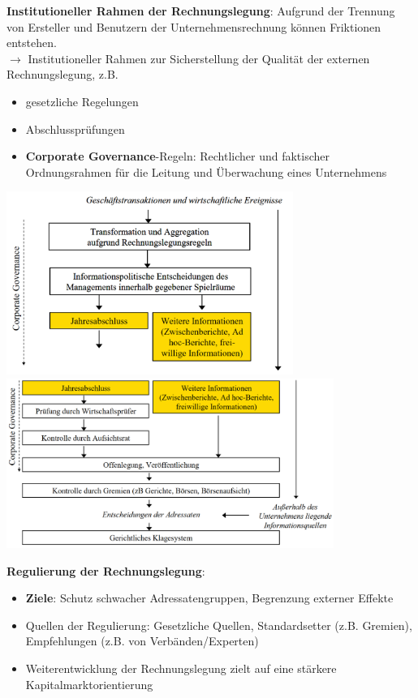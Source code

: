 \bigskip
\textbf{Institutioneller Rahmen der Rechnungslegung}:
Aufgrund der Trennung von Ersteller und Benutzern der Unternehmensrechnung können Friktionen entstehen. \\
$\rightarrow$ Institutioneller Rahmen zur Sicherstellung der Qualität der externen Rechnungslegung, z.B.
\begin{itemize}
	\item gesetzliche Regelungen
	\item Abschlussprüfungen
	\item \textbf{Corporate Governance}-Regeln: Rechtlicher und faktischer Ordnungsrahmen für die
	Leitung und Überwachung eines Unternehmens
\end{itemize}
\begin{center}
	\includegraphics[width=0.7\textwidth]{images/ir1.png}
	\includegraphics[width=0.8\textwidth]{images/ir2.png}
\end{center}

\textbf{Regulierung der Rechnungslegung}: 
\begin{itemize}
	\item \textbf{Ziele}: Schutz schwacher Adressatengruppen, Begrenzung externer Effekte
	\item Quellen der Regulierung: Gesetzliche Quellen, Standardsetter (z.B. Gremien), Empfehlungen (z.B. von Verbänden/Experten)
	\item Weiterentwicklung der Rechnungslegung zielt auf eine stärkere Kapitalmarktorientierung
\end{itemize}